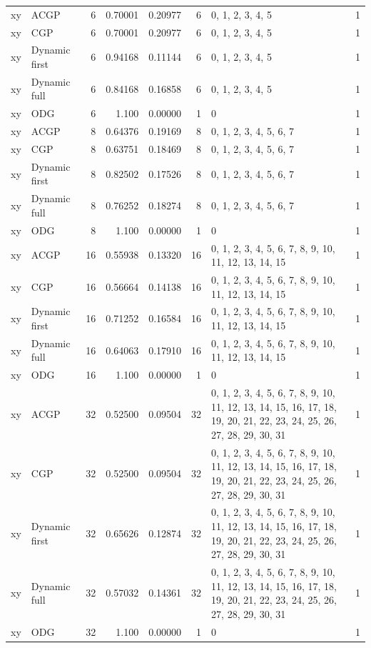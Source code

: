 \documentclass[10pt,a4paper]{article}
\begin{document}
\begin{longtable}{@{}p{23mm}p{29mm}rrrrp{36mm}r@{}}
xy & ACGP & 6 & 0.70001 & 0.20977 & 6 & 0, 1, 2, 3, 4, 5 & 1 \\
xy & CGP & 6 & 0.70001 & 0.20977 & 6 & 0, 1, 2, 3, 4, 5 & 1 \\
xy & Dynamic first & 6 & 0.94168 & 0.11144 & 6 & 0, 1, 2, 3, 4, 5 & 1 \\
xy & Dynamic full & 6 & 0.84168 & 0.16858 & 6 & 0, 1, 2, 3, 4, 5 & 1 \\
xy & ODG & 6 & 1.100 & 0.00000 & 1 & 0 & 1 \\
xy & ACGP & 8 & 0.64376 & 0.19169 & 8 & 0, 1, 2, 3, 4, 5, 6, 7 & 1 \\
xy & CGP & 8 & 0.63751 & 0.18469 & 8 & 0, 1, 2, 3, 4, 5, 6, 7 & 1 \\
xy & Dynamic first & 8 & 0.82502 & 0.17526 & 8 & 0, 1, 2, 3, 4, 5, 6, 7 & 1 \\
xy & Dynamic full & 8 & 0.76252 & 0.18274 & 8 & 0, 1, 2, 3, 4, 5, 6, 7 & 1 \\
xy & ODG & 8 & 1.100 & 0.00000 & 1 & 0 & 1 \\
xy & ACGP & 16 & 0.55938 & 0.13320 & 16 & 0, 1, 2, 3, 4, 5, 6, 7, 8, 9, 10, 11, 12, 13, 14, 15 & 1 \\
xy & CGP & 16 & 0.56664 & 0.14138 & 16 & 0, 1, 2, 3, 4, 5, 6, 7, 8, 9, 10, 11, 12, 13, 14, 15 & 1 \\
xy & Dynamic first & 16 & 0.71252 & 0.16584 & 16 & 0, 1, 2, 3, 4, 5, 6, 7, 8, 9, 10, 11, 12, 13, 14, 15 & 1 \\
xy & Dynamic full & 16 & 0.64063 & 0.17910 & 16 & 0, 1, 2, 3, 4, 5, 6, 7, 8, 9, 10, 11, 12, 13, 14, 15 & 1 \\
xy & ODG & 16 & 1.100 & 0.00000 & 1 & 0 & 1 \\
xy & ACGP & 32 & 0.52500 & 0.09504 & 32 & 0, 1, 2, 3, 4, 5, 6, 7, 8, 9, 10, 11, 12, 13, 14, 15, 16, 17, 18, 19, 20, 21, 22, 23, 24, 25, 26, 27, 28, 29, 30, 31 & 1 \\
xy & CGP & 32 & 0.52500 & 0.09504 & 32 & 0, 1, 2, 3, 4, 5, 6, 7, 8, 9, 10, 11, 12, 13, 14, 15, 16, 17, 18, 19, 20, 21, 22, 23, 24, 25, 26, 27, 28, 29, 30, 31 & 1 \\
xy & Dynamic first & 32 & 0.65626 & 0.12874 & 32 & 0, 1, 2, 3, 4, 5, 6, 7, 8, 9, 10, 11, 12, 13, 14, 15, 16, 17, 18, 19, 20, 21, 22, 23, 24, 25, 26, 27, 28, 29, 30, 31 & 1 \\
xy & Dynamic full & 32 & 0.57032 & 0.14361 & 32 & 0, 1, 2, 3, 4, 5, 6, 7, 8, 9, 10, 11, 12, 13, 14, 15, 16, 17, 18, 19, 20, 21, 22, 23, 24, 25, 26, 27, 28, 29, 30, 31 & 1 \\
xy & ODG & 32 & 1.100 & 0.00000 & 1 & 0 & 1 \\

\end{longtable}
\end{document}
